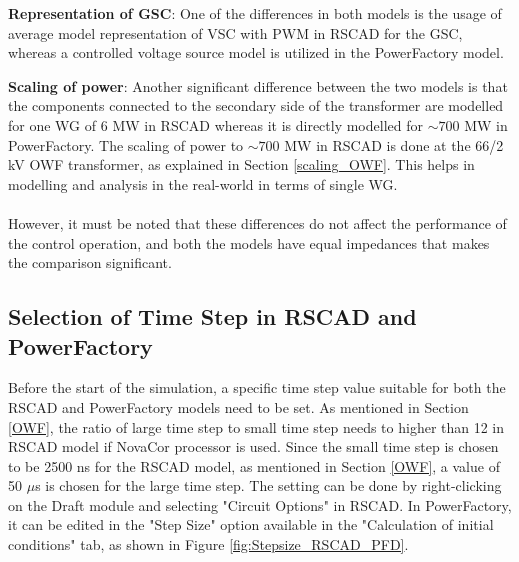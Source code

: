 \textbf{Representation of \gls{GSC}}: One of the differences in both models is the usage of average model representation of \gls{VSC} with \gls{PWM} in RSCAD for the \gls{GSC}, whereas a controlled voltage source model is utilized in the PowerFactory model.
\vspace{3mm}

\textbf{Scaling of power}: Another significant difference between the two models is that the components connected to the secondary side of the transformer are modelled for one \gls{WG} of 6 MW in RSCAD whereas it is directly modelled for $\sim{700}$ MW in PowerFactory. The scaling of power to $\sim{700}$ MW in RSCAD is done at the 66/2 kV \gls{OWF} transformer, as explained in Section \ref{scaling_OWF}. This helps in modelling and analysis in the real-world in terms of single \gls{WG}.
\vspace{-3mm}
\paragraph{}
However, it must be noted that these differences do not affect the performance of the control operation, and both the models have equal impedances that makes the comparison significant. 

\subsection{Selection of Time Step in RSCAD and PowerFactory}
Before the start of the simulation, a specific time step value suitable for both the RSCAD and PowerFactory models need to be set. As mentioned in Section \ref{OWF}, the ratio of large time step to small time step needs to higher than 12 in RSCAD model if NovaCor processor is used. Since the small time step is chosen to be 2500 ns for the RSCAD model, as mentioned in Section \ref{OWF}, a value of 50 $\mu$s is chosen for the large time step. The setting can be done by right-clicking on the Draft module and selecting "Circuit Options" in RSCAD. In PowerFactory, it can be edited in the "Step Size" option available in the "Calculation of initial conditions" tab, as shown in Figure \ref{fig:Stepsize_RSCAD_PFD}.  

